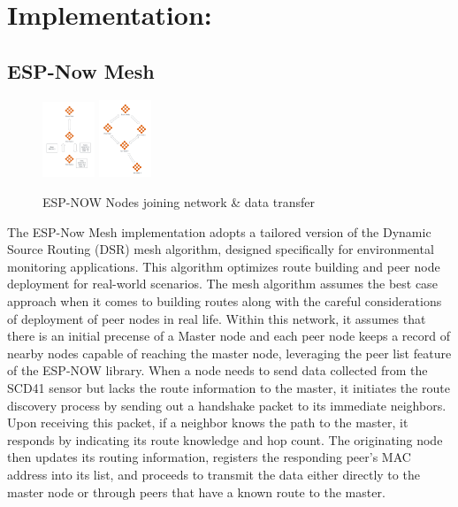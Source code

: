 \section{Implementation:}\label{sec:implementation}

\subsection{ESP-Now Mesh}\label{sec:espnowmesh}
\begin{figure}[H]
  \begin{center}
    \includegraphics[width=0.14\textwidth]{./Figures/ESP-NOW/espnow_join_mesh.png}
    \includegraphics[width=0.14\textwidth]{./Figures/ESP-NOW/espnow_data_transfer.png}
  \end{center}
  \caption{ESP-NOW Nodes joining network \& data transfer}\label{espnow_data_transfer}
\end{figure}

The ESP-Now Mesh implementation adopts a tailored version of the Dynamic Source Routing (DSR) mesh algorithm, designed specifically for environmental monitoring applications. This algorithm optimizes route building and peer node deployment for real-world scenarios. The mesh algorithm assumes the best case approach when it comes to building routes along with the careful considerations of deployment of peer nodes in real life. Within this network, it assumes that there is an initial precense of a Master node and each peer node keeps a record of nearby nodes capable of reaching the master node, leveraging the peer list feature of the ESP-NOW library. When a node needs to send data collected from the SCD41 sensor but lacks the route information to the master, it initiates the route discovery process by sending out a handshake packet to its immediate neighbors. Upon receiving this packet, if a neighbor knows the path to the master, it responds by indicating its route knowledge and hop count. The originating node then updates its routing information, registers the responding peer’s MAC address into its list, and proceeds to transmit the data either directly to the master node or through peers that have a known route to the master. 


